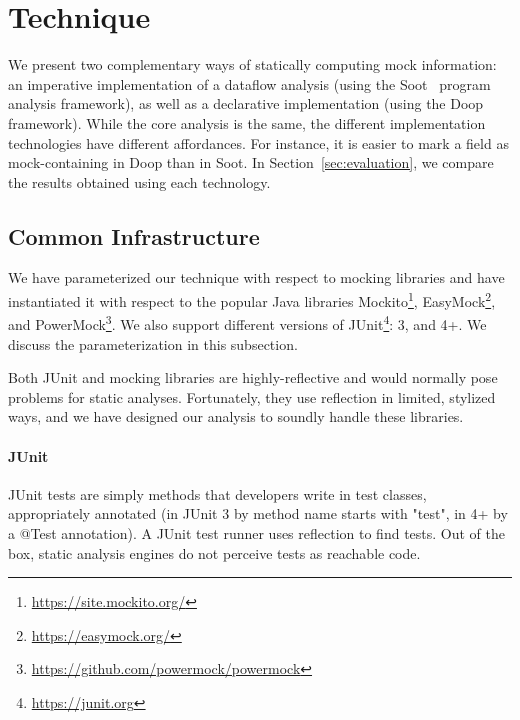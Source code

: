 \section{Technique}
\label{sec:technique}

We present two complementary ways of statically computing mock information: an imperative implementation of a dataflow analysis (using the Soot~\cite{Vallee-Rai:1999:SJB:781995.782008} program analysis framework), as well as a declarative implementation (using the Doop~\cite{conf/oopsla/BravenboerS09} framework). While the core analysis is the same, the different implementation technologies have different affordances. For instance, it is easier to mark a field as mock-containing in Doop than in Soot. In Section~\ref{sec:evaluation}, we compare the results obtained using each technology.

\subsection{Common Infrastructure}
We have parameterized our technique with respect to mocking libraries and have instantiated it with respect to the popular Java libraries Mockito\footnote{\url{https://site.mockito.org/}}, EasyMock\footnote{\url{https://easymock.org/}}, and PowerMock\footnote{\url{https://github.com/powermock/powermock}}. We also support different versions of JUnit\footnote{\url{https://junit.org}}: 3, and 4+. We discuss the parameterization in this subsection.

Both JUnit and mocking libraries are highly-reflective and would normally pose problems for static analyses. Fortunately, they use reflection in limited, stylized ways, and we have designed our analysis to soundly handle these libraries.

\paragraph{JUnit}
JUnit tests are simply methods that developers write in test classes, appropriately annotated (in JUnit 3 by method name starts with "test", in 4+ by a @Test annotation). A JUnit test runner uses reflection to find tests. Out of the box, static analysis engines do not perceive tests as reachable code.


